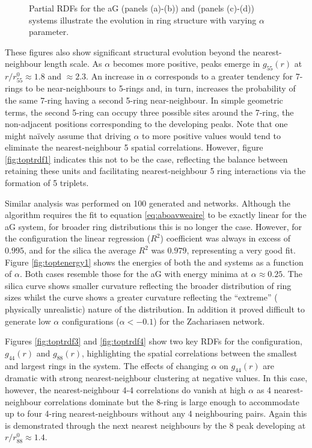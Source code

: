 \begin{figure}[bt]
     \caption{Partial RDFs for the aG (panels (a)\--(b)) and \zach{} (panels (c)\--(d)) systems illustrate the evolution in ring structure with varying $\alpha$ parameter.}
     \label{fig:toptrdf}
\end{figure}

These figures also show significant structural evolution beyond the nearest-neighbour length scale. 
As $\alpha$ becomes more positive, peaks emerge in $g_{55}\left(r\right)$ at $r/r_{55}^0\approx{1.8}$ and $\approx{2.3}$. 
An increase in $\alpha$ corresponds to a greater tendency for 7\--rings to
be near\--neighbours to 5\--rings and, in turn, increases the probability of the same 7\--ring having a second 5\--ring near\--neighbour. 
In simple geometric terms, the second 5\--ring can occupy three possible sites around the 7\--ring, the non\--adjacent positions corresponding to the developing peaks. 
Note that one might na\"ively assume that driving $\alpha$ to more positive values would tend to eliminate the nearest-neighbour 5 spatial correlations. However, figure \ref{fig:toptrdf1} indicates this not to be the case, reflecting the balance between retaining these units and facilitating nearest\--neighbour 5 ring interactions via the formation of 5 triplets.

Similar analysis was performed on 100 generated \zach{} and \sioii{} networks.
Although the algorithm requires the fit to equation \eqref{eq:aboavweaire} to be exactly linear for the aG system, for broader ring distributions this is no longer the case. 
However, for the \zach{} configuration the linear regression ($R^2$) coefficient was always in excess of $0.995$, and for the silica the average $R^{2}$ was $0.979$, representing a very good fit. 
Figure \ref{fig:toptenergy1} shows the energies of both the \zach{} and \sioii{} systems as a function of $\alpha$. 
Both cases resemble those for the aG with energy minima at $\alpha\approx{0.25}$. The silica curve shows smaller curvature reflecting the broader distribution
of ring sizes whilst the \zach{} curve shows a greater curvature reflecting the ``extreme'' (\ie{} physically unrealistic) nature of the distribution.
In addition it proved difficult to generate low $\alpha$ configurations ($\alpha<-0.1$) for the Zachariasen network.

Figures \ref{fig:toptrdf3} and \ref{fig:toptrdf4} show two key RDFs for the \zach{} configuration, $g_{44}\left(r\right)$ and $g_{88}\left(r\right)$, highlighting the spatial correlations between the smallest and largest rings in the system. 
The effects of changing $\alpha$ on $g_{44}\left(r\right)$ are dramatic with strong nearest\--neighbour clustering at negative values. 
In this case, however, the nearest-neighbour 4-4 correlations do vanish at high $\alpha$ as 4 nearest\--neighbour correlations dominate but the 8\--ring is large enough to accommodate up to four 4\--ring nearest\--neighbours without any 4 neighbouring pairs. 
Again this is demonstrated through the next nearest neighbours by the 8 peak developing at $r/r_{88}^0\approx 1.4$.


